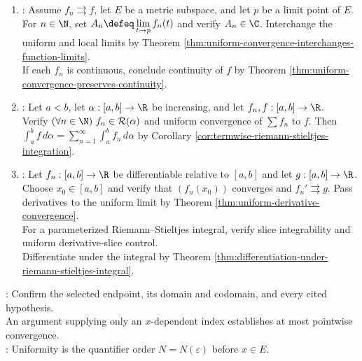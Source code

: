 \begin{proofmethod}
\begin{enumerate}[label=(\roman*)]
\item {}: Assume $f_n\rightrightarrows f$, let $E$ be a metric subspace, and let $p$ be a limit point of $E$.\\
For $n\in\N$, set $A_n\defeq\lim\limits_{t\to p}f_n(t)$ and verify $A_n\in\C$. Interchange the uniform and local limits by Theorem \ref{thm:uniform-convergence-interchanges-function-limits}.\\
If each $f_n$ is continuous, conclude continuity of $f$ by Theorem \ref{thm:uniform-convergence-preserves-continuity}.
\item {}: Let $a<b$, let $\alpha:[a,b]\to\R$ be increasing, and let $f_n,f:[a,b]\to\R$.\\
Verify $(\forall n\in\N)\ f_n\in\mathcal{R}(\alpha)$ and uniform convergence of $\sum f_n$ to $f$. Then $\int_a^b f\,d\alpha=\sum\limits_{n=1}^{\infty}\int_a^b f_n\,d\alpha$ by Corollary \ref{cor:termwise-riemann-stieltjes-integration}.
\item {}: Let $f_n:[a,b]\to\R$ be differentiable relative to $[a,b]$ and let $g:[a,b]\to\R$.\\
Choose $x_0\in[a,b]$ and verify that $(f_n(x_0))$ converges and $f_n'\rightrightarrows g$. Pass derivatives to the uniform limit by Theorem \ref{thm:uniform-derivative-convergence}.\\
For a parameterized Riemann--Stieltjes integral, verify slice integrability and uniform derivative-slice control.\\
Differentiate under the integral by Theorem \ref{thm:differentiation-under-riemann-stieltjes-integral}.
\end{enumerate}
: Confirm the selected endpoint, its domain and codomain, and every cited hypothesis.\\
An argument supplying only an $x$-dependent index establishes at most pointwise convergence.\\
: Uniformity is the quantifier order $N=N(\varepsilon)$ before $x\in E$.
\end{proofmethod}
